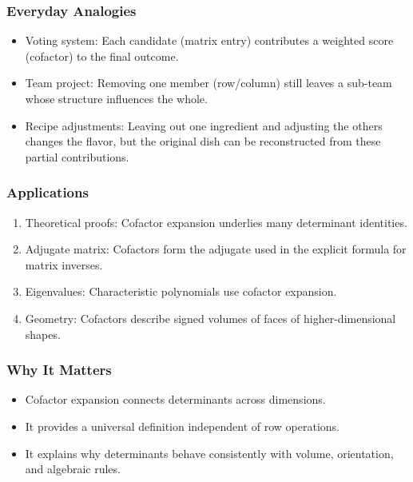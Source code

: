 \documentclass[
  letterpaper,
  DIV=11,
  numbers=noendperiod]{scrreprt}
\providecommand{\tightlist}{%
  \setlength{\itemsep}{0pt}\setlength{\parskip}{0pt}}
\begin{document}
\subsubsection{Everyday Analogies}\label{everyday-analogies-53}

\begin{itemize}
\tightlist
\item
  Voting system: Each candidate (matrix entry) contributes a weighted
  score (cofactor) to the final outcome.
\item
  Team project: Removing one member (row/column) still leaves a sub-team
  whose structure influences the whole.
\item
  Recipe adjustments: Leaving out one ingredient and adjusting the
  others changes the flavor, but the original dish can be reconstructed
  from these partial contributions.
\end{itemize}

\subsubsection{Applications}\label{applications-19}

\begin{enumerate}
\def\labelenumi{\arabic{enumi}.}
\tightlist
\item
  Theoretical proofs: Cofactor expansion underlies many determinant
  identities.
\item
  Adjugate matrix: Cofactors form the adjugate used in the explicit
  formula for matrix inverses.
\item
  Eigenvalues: Characteristic polynomials use cofactor expansion.
\item
  Geometry: Cofactors describe signed volumes of faces of
  higher-dimensional shapes.
\end{enumerate}

\subsubsection{Why It Matters}\label{why-it-matters-53}

\begin{itemize}
\tightlist
\item
  Cofactor expansion connects determinants across dimensions.
\item
  It provides a universal definition independent of row operations.
\item
  It explains why determinants behave consistently with volume,
  orientation, and algebraic rules.
\end{itemize}
\end{document}
